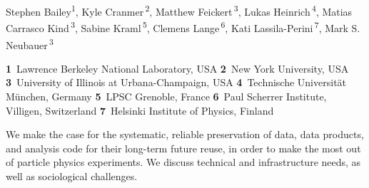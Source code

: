 \documentclass[11pt]{article}
\begin{document}
\pubblock

\snowmass{}


\medskip


\begin{center}
Stephen Bailey\textsuperscript{1},
Kyle Cranmer\,\textsuperscript{2},
Matthew Feickert\,\textsuperscript{3},
Lukas Heinrich\,\textsuperscript{4},
Matias Carrasco Kind\,\textsuperscript{3},
Sabine Kraml\,\textsuperscript{5},
Clemens Lange\,\textsuperscript{6},
Kati Lassila-Perini\,\textsuperscript{7},
Mark S. Neubauer\,\textsuperscript{3}
\end{center}

\begin{center}
\textbf{1}~Lawrence Berkeley National Laboratory, USA
\textbf{2}~New York University, USA
\textbf{3}~University of Illinois at Urbana-Champaign, USA
\textbf{4}~Technische Universität München, Germany
\textbf{5}~LPSC Grenoble, France
\textbf{6}~Paul Scherrer Institute, Villigen, Switzerland
\textbf{7}~Helsinki Institute of Physics, Finland
\end{center}

\begin{Abstract}
\noindent We make the case for the systematic, reliable preservation of data, data products, and analysis code for their long-term future reuse, in order to make the most out of particle physics experiments.
We discuss technical and infrastructure needs, as well as sociological challenges.
\end{Abstract}
\end{document}
